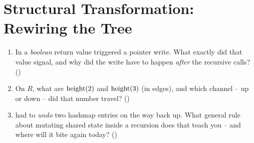 \section{Structural Transformation: Rewiring the Tree}\label{sec:c02-transform}

\begin{previouslybox}
\begin{enumerate}[nosep, leftmargin=1.6em]
  \item In  a \emph{boolean} return value triggered a pointer
        write. What exactly did that value signal, and why did the write have to
        happen \emph{after} the recursive calls? ()
  \item On $R$, what are $\operatorname{height}(2)$ and $\operatorname{height}(3)$ (in edges), and which
        channel -- up or down -- did that number travel? ()
  \item {} had to \emph{undo} two hashmap entries on the
        way back up. What general rule about mutating shared state inside a
        recursion does that teach you -- and where will it bite again today?
        ()
\end{enumerate}
\end{previouslybox}

